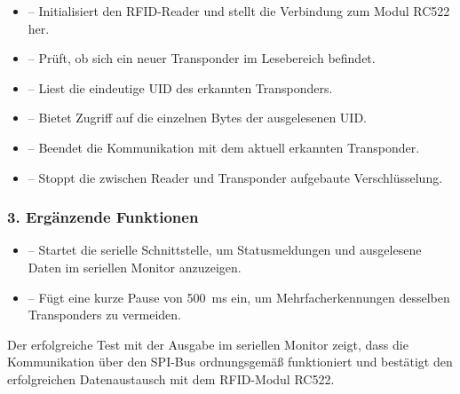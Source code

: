 \begin{itemize}
	\item {} – Initialisiert den RFID-Reader und stellt die Verbindung zum Modul RC522 her.
	\item {} – Prüft, ob sich ein neuer Transponder im Lesebereich befindet.
	\item {} – Liest die eindeutige UID des erkannten Transponders.
	\item {} – Bietet Zugriff auf die einzelnen Bytes der ausgelesenen UID.
	\item {} – Beendet die Kommunikation mit dem aktuell erkannten Transponder.
	\item {} – Stoppt die zwischen Reader und Transponder aufgebaute Verschlüsselung.
\end{itemize}

\subsubsection*{3. Ergänzende Funktionen}

\begin{itemize}
	\item {} – Startet die serielle Schnittstelle, 
	um Statusmeldungen und ausgelesene Daten im seriellen Monitor anzuzeigen.
	\item {} – Fügt eine kurze Pause von 500~ms ein, 
	um Mehrfacherkennungen desselben Transponders zu vermeiden.
\end{itemize}

Der erfolgreiche Test mit der Ausgabe im seriellen Monitor zeigt, 
dass die Kommunikation über den SPI-Bus ordnungsgemäß funktioniert 
und bestätigt den erfolgreichen Datenaustausch mit dem RFID-Modul RC522.

 



%
%
%
%

